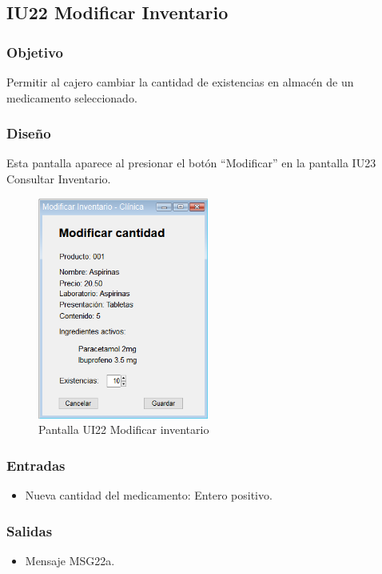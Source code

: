 

\subsection{IU22 Modificar Inventario}

\subsubsection{Objetivo}
Permitir al cajero cambiar la cantidad de existencias en almacén de un medicamento seleccionado.

\subsubsection{Diseño}
Esta pantalla aparece al presionar el botón ``Modificar'' en la pantalla IU23 Consultar Inventario.

\begin{figure}[htbp!]
	\centering
	\includegraphics[width=0.5\textwidth]{images/gui/ui22_modificar_inventario}
	\caption{Pantalla UI22 Modificar inventario}
\end{figure}

\subsubsection{Entradas}
\begin{itemize}
	\item Nueva cantidad del medicamento: Entero positivo.
\end{itemize}

\subsubsection{Salidas}
\begin{itemize}
	\item Mensaje MSG22a.
\end{itemize}


